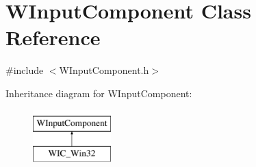 \hypertarget{class_w_input_component}{}\section{W\+Input\+Component Class Reference}
\label{class_w_input_component}


{\ttfamily \#include $<$W\+Input\+Component.\+h$>$}

Inheritance diagram for W\+Input\+Component\+:\begin{figure}[H]
\begin{center}
\leavevmode
\includegraphics[height=2.000000cm]{class_w_input_component}
\end{center}
\end{figure}
